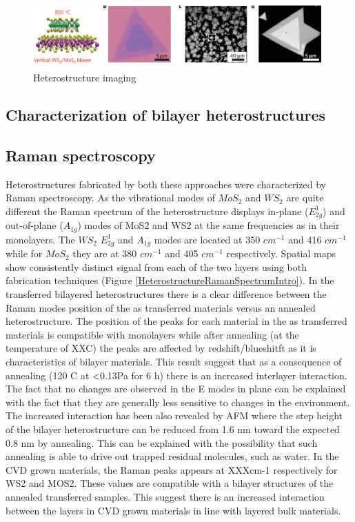 \begin{figure}[h]
	\begin{center}
		\includegraphics[scale=1]{Heterostructures/HeterostructureOpticalSEMAFMImages.png}
		\caption{Heterostructure imaging}
		\label{fig:HeterostructuresOpticalSEMAFMImages}
	\end{center}
\end{figure}

\subsection{Characterization of bilayer heterostructures}

\subsection{Raman spectroscopy}

Heterostructures fabricated by both these approaches were characterized by Raman spectroscopy. As the vibrational modes of $MoS_2$ and $WS_2$ are quite different the Raman spectrum of the heterostructure displays in-plane ($E^1_{2g}$) and out-of-plane ($A_{1g}$) modes of MoS2 and WS2 at the same frequencies as in their monolayers. The $WS_2$ $E^1_{2g}$ and $A_{1g}$ modes are located at 350 $cm^{-1}$ and 416 $cm^{-1}$ while for $MoS_2$ they are at 380 $cm^{-1}$ and 405 $cm^{-1}$ respectively. Spatial maps show consistently distinct signal from each of the two layers using both fabrication techniques (Figure \ref{HeterostructureRamanSpectrumIntro}). In the transferred bilayered heterostructures there is a clear difference  between the Raman modes position of the as transferred materials versus  an annealed heterostructure. The position of the peaks for each material in the as transferred materials is compatible with  monolayers while after annealing (at the temperature of XXC) the peaks are affected by redshift/blueshitft as it is characteristics of bilayer materials. This result suggest that as a consequence of annealing (120 {\degree}C at <0.13Pa for 6 h) there is an increased interlayer interaction. The fact that no changes are observed in the E modes in plane can be explained with the fact that they are generally less sensitive to changes in the environment. The increased interaction has been also revealed by AFM where the  step height of the bilayer heterostructure can be reduced from 1.6 nm toward the expected 0.8 nm by annealing. This can be explained with the possibility that such annealing is able to drive out trapped residual molecules, such as water. In the CVD grown materials, the Raman peaks appears at XXXcm-1 respectively for WS2 and MOS2. These values are compatible with a bilayer structures of the annealed transferred samples. This suggest there is an increased interaction between the layers in CVD grown materials in line with layered bulk materials.

